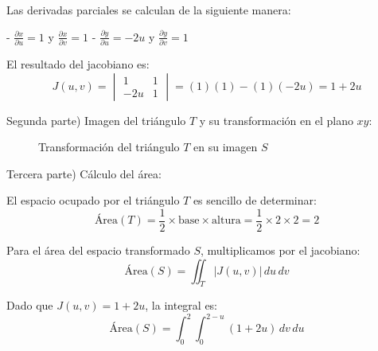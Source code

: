 \documentclass{report}
\begin{document}
Las derivadas parciales se calculan de la siguiente manera:

- $\frac{\partial x}{\partial u} = 1$ y $\frac{\partial x}{\partial v} = 1$
- $\frac{\partial y}{\partial u} = -2u$ y $\frac{\partial y}{\partial v} = 1$

El resultado del jacobiano es:
$$
J(u, v) = \begin{vmatrix} 1 & 1 \\ -2u & 1 \end{vmatrix}
= (1)(1) - (1)(-2u) = 1 + 2u
$$

Segunda parte) Imagen del triángulo $T$ y su transformación en el plano $xy$:

\begin{figure}[h!]
    \centering
    
    \hspace{1cm}

    \caption{Transformación del triángulo $T$ en su imagen $S$}
\end{figure}

Tercera parte) Cálculo del área:

El espacio ocupado por el triángulo $T$ es sencillo de determinar:
$$
\text{Área}(T) = \frac{1}{2} \times \text{base} \times \text{altura} = \frac{1}{2} \times 2 \times 2 = 2
$$

Para el área del espacio transformado $S$, multiplicamos por el jacobiano:
$$
\text{Área}(S) = \iint_T |J(u, v)| \, du \, dv
$$

Dado que $J(u, v) = 1 + 2u$, la integral es:
$$
\text{Área}(S) = \int_0^2 \int_0^{2-u} (1 + 2u) \, dv \, du
$$
\end{document}
